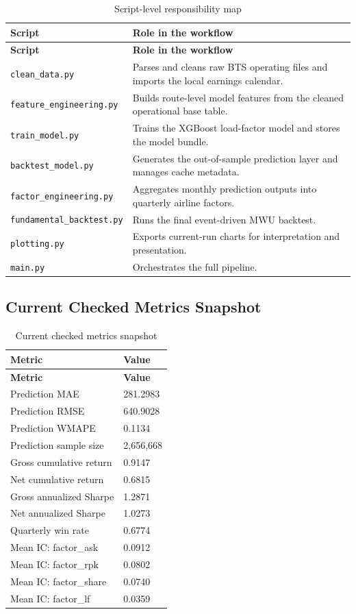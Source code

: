 \documentclass[11pt,a4paper]{article}
\begin{document}
\begin{longtable}{p{3.2cm} p{9.6cm}}
\caption{Script-level responsibility map}\label{tab:script_map}\\
\toprule
\textbf{Script} & \textbf{Role in the workflow} \\
\midrule
\endfirsthead
\toprule
\textbf{Script} & \textbf{Role in the workflow} \\
\midrule
\endhead
\texttt{clean\_data.py} & Parses and cleans raw BTS operating files and imports the local earnings calendar. \\
\texttt{feature\_engineering.py} & Builds route-level model features from the cleaned operational base table. \\
\texttt{train\_model.py} & Trains the XGBoost load-factor model and stores the model bundle. \\
\texttt{backtest\_model.py} & Generates the out-of-sample prediction layer and manages cache metadata. \\
\texttt{factor\_engineering.py} & Aggregates monthly prediction outputs into quarterly airline factors. \\
\texttt{fundamental\_backtest.py} & Runs the final event-driven MWU backtest. \\
\texttt{plotting.py} & Exports current-run charts for interpretation and presentation. \\
\texttt{main.py} & Orchestrates the full pipeline. \\
\bottomrule
\end{longtable}

\subsection{Current Checked Metrics Snapshot}

\begin{longtable}{p{6.0cm} p{4.8cm}}
\caption{Current checked metrics snapshot}\label{tab:metrics_snapshot}\\
\toprule
\textbf{Metric} & \textbf{Value} \\
\midrule
\endfirsthead
\toprule
\textbf{Metric} & \textbf{Value} \\
\midrule
\endhead
Prediction MAE & 281.2983 \\
Prediction RMSE & 640.9028 \\
Prediction WMAPE & 0.1134 \\
Prediction sample size & 2,656,668 \\
Gross cumulative return & 0.9147 \\
Net cumulative return & 0.6815 \\
Gross annualized Sharpe & 1.2871 \\
Net annualized Sharpe & 1.0273 \\
Quarterly win rate & 0.6774 \\
Mean IC: factor\_ask & 0.0912 \\
Mean IC: factor\_rpk & 0.0802 \\
Mean IC: factor\_share & 0.0740 \\
Mean IC: factor\_lf & 0.0359 \\
\bottomrule
\end{longtable}
\end{document}
